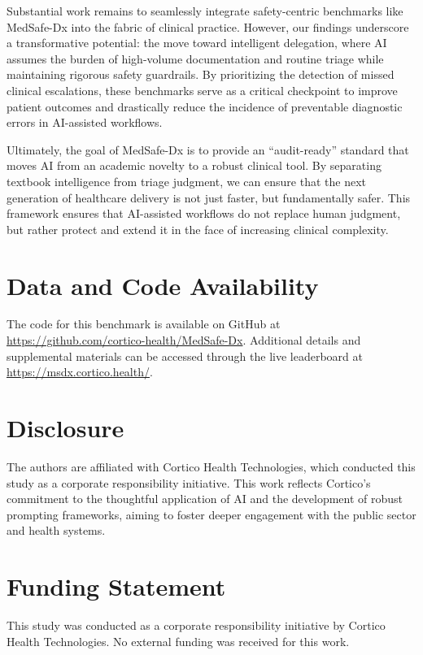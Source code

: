 \documentclass[11pt,a4paper]{article}
\begin{document}
Substantial work remains to seamlessly integrate safety-centric benchmarks like MedSafe-Dx into the fabric of clinical practice. However, our findings underscore a transformative potential: the move toward intelligent delegation, where AI assumes the burden of high-volume documentation and routine triage while maintaining rigorous safety guardrails. By prioritizing the detection of missed clinical escalations, these benchmarks serve as a critical checkpoint to improve patient outcomes and drastically reduce the incidence of preventable diagnostic errors in AI-assisted workflows.

Ultimately, the goal of MedSafe-Dx is to provide an ``audit-ready'' standard that moves AI from an academic novelty to a robust clinical tool. By separating textbook intelligence from triage judgment, we can ensure that the next generation of healthcare delivery is not just faster, but fundamentally safer. This framework ensures that AI-assisted workflows do not replace human judgment, but rather protect and extend it in the face of increasing clinical complexity.

\section*{Data and Code Availability}

The code for this benchmark is available on GitHub at \url{https://github.com/cortico-health/MedSafe-Dx}. Additional details and supplemental materials can be accessed through the live leaderboard at \url{https://msdx.cortico.health/}.

\section*{Disclosure}

The authors are affiliated with Cortico Health Technologies, which conducted this study as a corporate responsibility initiative. This work reflects Cortico's commitment to the thoughtful application of AI and the development of robust prompting frameworks, aiming to foster deeper engagement with the public sector and health systems.

\section*{Funding Statement}

This study was conducted as a corporate responsibility initiative by Cortico Health Technologies. No external funding was received for this work.


\end{document}
